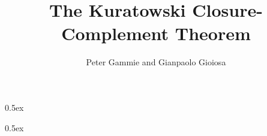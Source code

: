 \documentclass[11pt,a4paper]{article}
\begin{document}
\parindent 0pt\parskip 0.5ex

\title{The Kuratowski Closure-Complement Theorem}
\author{Peter Gammie and Gianpaolo Gioiosa}
\maketitle

\tableofcontents

\parindent 0pt\parskip 0.5ex





\end{document}
